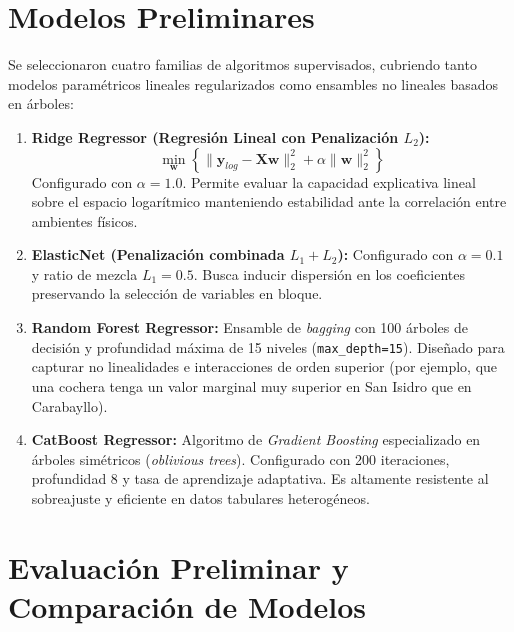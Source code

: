 \documentclass[11pt,a4paper]{article}
\begin{document}
\section{Modelos Preliminares}

Se seleccionaron cuatro familias de algoritmos supervisados, cubriendo tanto modelos paramétricos lineales regularizados como ensambles no lineales basados en árboles:
\begin{enumerate}[leftmargin=1.5cm]
    \item \textbf{Ridge Regressor (Regresión Lineal con Penalización $L_2$):}
    \begin{equation}
        \min_{\mathbf{w}} \left\{ \|\mathbf{y}_{log} - \mathbf{X}\mathbf{w}\|_2^2 + \alpha \|\mathbf{w}\|_2^2 \right\}
    \end{equation}
    Configurado con $\alpha = 1.0$. Permite evaluar la capacidad explicativa lineal sobre el espacio logarítmico manteniendo estabilidad ante la correlación entre ambientes físicos.
    \item \textbf{ElasticNet (Penalización combinada $L_1 + L_2$):}
    Configurado con $\alpha = 0.1$ y ratio de mezcla $L_1 = 0.5$. Busca inducir dispersión en los coeficientes preservando la selección de variables en bloque.
    \item \textbf{Random Forest Regressor:} Ensamble de \textit{bagging} con 100 árboles de decisión y profundidad máxima de 15 niveles (\texttt{max\_depth=15}). Diseñado para capturar no linealidades e interacciones de orden superior (por ejemplo, que una cochera tenga un valor marginal muy superior en San Isidro que en Carabayllo).
    \item \textbf{CatBoost Regressor:} Algoritmo de \textit{Gradient Boosting} especializado en árboles simétricos (\textit{oblivious trees}). Configurado con 200 iteraciones, profundidad 8 y tasa de aprendizaje adaptativa. Es altamente resistente al sobreajuste y eficiente en datos tabulares heterogéneos.
\end{enumerate}

\section{Evaluación Preliminar y Comparación de Modelos}
\end{document}

